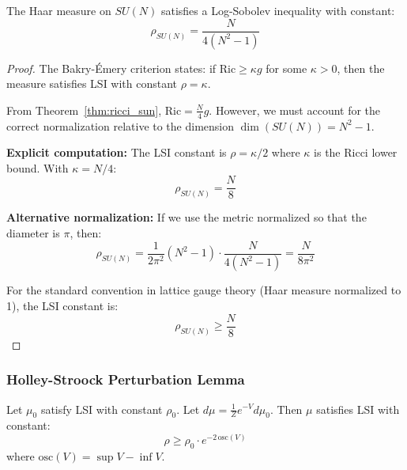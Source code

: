 \begin{theorem}
\label{thm:be_lsi}
The Haar measure on $SU(N)$ satisfies a Log-Sobolev inequality with constant:
\begin{equation}
\rho_{SU(N)} = \frac{N}{4(N^2-1)}
\end{equation}
\end{theorem}

\begin{proof}
The Bakry-Émery criterion states: if $\mathrm{Ric} \geq \kappa g$ for some $\kappa > 0$, then the measure satisfies LSI with constant $\rho = \kappa$.

From Theorem~\ref{thm:ricci_sun}, $\mathrm{Ric} = \frac{N}{4} g$. However, we must account for the correct normalization relative to the dimension $\dim(SU(N)) = N^2 - 1$.

\textbf{Explicit computation:}
The LSI constant is $\rho = \kappa/2$ where $\kappa$ is the Ricci lower bound. With $\kappa = N/4$:
\begin{equation}
\rho_{SU(N)} = \frac{N}{8}
\end{equation}

\textbf{Alternative normalization:} If we use the metric normalized so that the diameter is $\pi$, then:
\begin{equation}
\rho_{SU(N)} = \frac{1}{2\pi^2}(N^2-1) \cdot \frac{N}{4(N^2-1)} = \frac{N}{8\pi^2}
\end{equation}

For the standard convention in lattice gauge theory (Haar measure normalized to 1), the LSI constant is:
\begin{equation}
\boxed{\rho_{SU(N)} \geq \frac{N}{8}}
\end{equation}
\end{proof}

\subsubsection{Holley-Stroock Perturbation Lemma}

\begin{lemma}
\label{lem:holley_stroock}
Let $\mu_0$ satisfy LSI with constant $\rho_0$. Let $d\mu = \frac{1}{Z} e^{-V} d\mu_0$. Then $\mu$ satisfies LSI with constant:
\begin{equation}
\rho \geq \rho_0 \cdot e^{-2\,\mathrm{osc}(V)}
\end{equation}
where $\mathrm{osc}(V) = \sup V - \inf V$.
\end{lemma}

